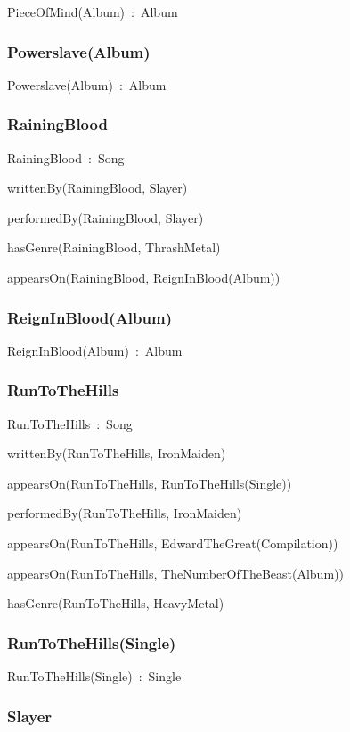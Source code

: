 \documentclass{article}
\begin{document}
PieceOfMind(Album)~:~Album

\subsubsection*{Powerslave(Album)}

Powerslave(Album)~:~Album

\subsubsection*{RainingBlood}

RainingBlood~:~Song

writtenBy(RainingBlood, Slayer)

performedBy(RainingBlood, Slayer)

hasGenre(RainingBlood, ThrashMetal)

appearsOn(RainingBlood, ReignInBlood(Album))

\subsubsection*{ReignInBlood(Album)}

ReignInBlood(Album)~:~Album

\subsubsection*{RunToTheHills}

RunToTheHills~:~Song

writtenBy(RunToTheHills, IronMaiden)

appearsOn(RunToTheHills, RunToTheHills(Single))

performedBy(RunToTheHills, IronMaiden)

appearsOn(RunToTheHills, EdwardTheGreat(Compilation))

appearsOn(RunToTheHills, TheNumberOfTheBeast(Album))

hasGenre(RunToTheHills, HeavyMetal)

\subsubsection*{RunToTheHills(Single)}

RunToTheHills(Single)~:~Single

\subsubsection*{Slayer}
\end{document}
